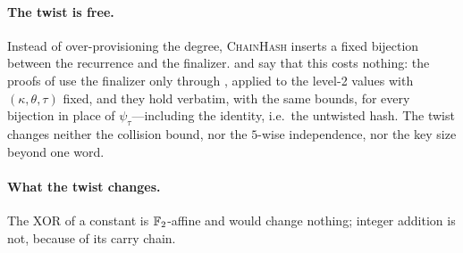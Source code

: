 \paragraph{The twist is free.}
Instead of over-provisioning the degree, \textsc{ChainHash} inserts a fixed
bijection between the recurrence and the finalizer.   and
 say that this costs nothing: the proofs of
 use the finalizer only through
, applied to the level-2 values with
$(\kappa,\theta,\tau)$ fixed, and they hold verbatim, with the same bounds,
for every bijection in place of $\psi_\tau$---including the identity, i.e.\
the untwisted hash.  The twist changes neither the collision bound, nor the
$5$-wise independence, nor the key size beyond one word.

\paragraph{What the twist changes.}
The XOR of a constant is $\mathbb{F}_2$-affine and would change nothing; integer
addition is not, because of its carry chain.

